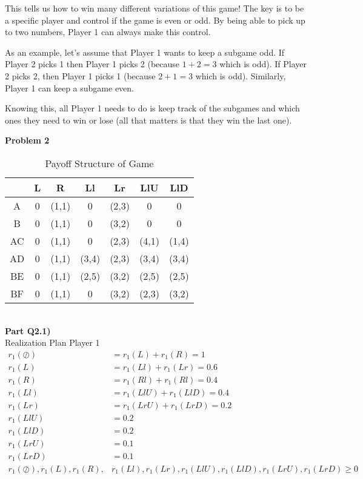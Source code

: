 \documentclass[12pt,letter]{article}
\newcommand{\problem}[1]{\vspace{3mm}\Large\textbf{{Problem {#1}\vspace{3mm}}}\normalsize\\}
\newcommand{\ppart}[1]{\vspace{2mm}\large\textbf{\\Part {#1})\vspace{2mm}}\normalsize\\}
\begin{document}
This tells us how to win many different variations of this game! The key is to 
be a specific player and control if the game is even or odd. By being able to
pick up to two numbers, Player 1 can always make this control. 

As an example, let's assume that Player 1 wants to keep a subgame odd. If Player
2 picks 1 then Player 1 picks 2 (because $1+2=3$ which is odd). If Player 2 picks
2, then Player 1 picks 1 (because $2+1=3$ which is odd). Similarly, Player 1
can keep a subgame even. 

Knowing this, all Player 1 needs to do is keep track of the subgames and which
ones they need to win or lose (all that matters is that they win the last one).


\problem{2}
\begin{table}
    \centering
\begin{tabular}{|c|c|c|c|c|c|c|}
    \hline
       & L & R     & Ll& Lr    & LlU & LlD\\
    \hline
    A  & 0 & (1,1) & 0 & (2,3) & 0 & 0\\
    \hline
    B  & 0 & (1,1) & 0 & (3,2) & 0 & 0\\
    \hline
    AC & 0 & (1,1) & 0 & (2,3) & (4,1) & (1,4)\\
    \hline
    AD & 0 & (1,1) & (3,4) & (2,3) & (3,4) & (3,4)\\
    \hline
    BE & 0 & (1,1) & (2,5) & (3,2) & (2,5) &(2,5) \\
    \hline
    BF & 0 & (1,1) & 0 & (3,2) & (2,3) & (3,2)\\
    \hline
\end{tabular}
    \label{tab:EFG}
    \caption{Payoff Structure of Game}
\end{table}

\ppart{Q2.1}
Realization Plan Player 1
\begin{align*}
    r_1(\oslash) &= r_1(L) + r_1(R) = 1 \\
    r_1(L) &= r_1(Ll) + r_1(Lr) = 0.6\\
    r_1(R) &= r_1(Rl) + r_1(Rl) = 0.4\\
    r_1(Ll) &= r_1(LlU) + r_1(LlD) = 0.4\\
    r_1(Lr) &= r_1(LrU) + r_1(LrD) = 0.2\\
    r_1(LlU) &= 0.2\\
    r_1(LlD) &= 0.2\\
    r_1(LrU) &= 0.1\\
    r_1(LrD) &= 0.1\\
    r_1(\oslash),r_1(L),r_1(R),&r_1(Ll),r_1(Lr),r_1(LlU), r_1(LlD), r_1(LrU), r_1(LrD) \geq 0\\
\end{align*}
\end{document}
